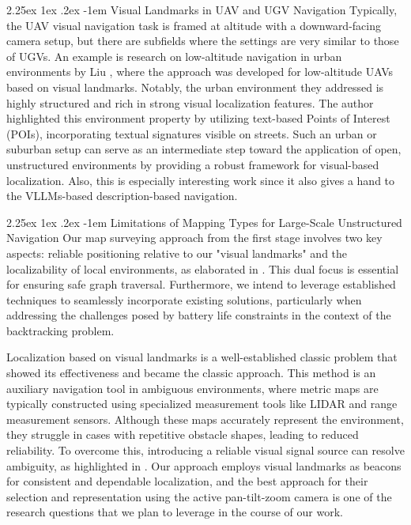 \documentclass[runningheads]{llncs}
\makeatletter
\renewcommand\paragraph{\@startsection{paragraph}{4}{\z@}%
                                    {2.25ex \@plus1ex \@minus.2ex}%
                                    {-1em}%
                                    {\normalfont\normalsize\bfseries}}
\makeatother
\begin{document}
\paragraph{Visual Landmarks in UAV and UGV Navigation}
Typically, the UAV visual navigation task is framed at altitude with a downward-facing camera setup, but there are subfields where the settings are very similar to those of UGVs. An example is research on low-altitude navigation in urban environments by Liu \cite{POI_and_store_signature}, where the approach was developed for low-altitude UAVs based on visual landmarks. Notably, the urban environment they addressed is highly structured and rich in strong visual localization features. The author highlighted this environment property by utilizing text-based Points of Interest (POIs), incorporating textual signatures visible on streets. Such an urban or suburban setup can serve as an intermediate step toward the application of open, unstructured environments by providing a robust framework for visual-based localization. Also, this is especially interesting work since it also gives a hand to the VLLMs-based description-based navigation.

\paragraph{Limitations of Mapping Types for Large-Scale Unstructured Navigation}
Our map surveying approach from the first stage involves two key aspects: reliable positioning relative to our "visual landmarks" and the localizability of local environments, as elaborated in \cite{LocalizabilityPathPlanning}. This dual focus is essential for ensuring safe graph traversal. Furthermore, we intend to leverage established techniques to seamlessly incorporate existing solutions, particularly when addressing the challenges posed by battery life constraints in the context of the backtracking problem.

Localization based on visual landmarks is a well-established classic problem \cite{LandmarksFoundation} that showed its effectiveness \cite{LandmarksEffectivenessExperiment} and became the classic approach. This method is an auxiliary navigation tool in ambiguous environments, where metric maps are typically constructed using specialized measurement tools like LIDAR and range measurement sensors. Although these maps accurately represent the environment, they struggle in cases with repetitive obstacle shapes, leading to reduced reliability. To overcome this, introducing a reliable visual signal source can resolve ambiguity, as highlighted in \cite{LandmarksEffectivenessExperiment}. Our approach employs visual landmarks as beacons for consistent and dependable localization, and the best approach for their selection and representation using the active pan-tilt-zoom camera is one of the research questions that we plan to leverage in the course of our work.
\end{document}

